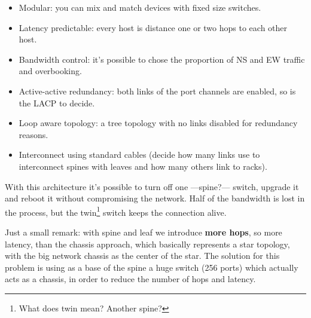 \begin{itemize}
   \item Modular: you can mix and match devices with fixed size switches.
   \item Latency predictable: every host is distance one or two hops to each other host.
   \item Bandwidth control: it's possible to chose the proportion of NS and EW traffic and overbooking.
   \item Active-active redundancy:  both links of the port channels are enabled, so is the LACP to decide.
   \item Loop aware topology: a tree topology with no links disabled for redundancy reasons.
   \item Interconnect using standard cables (decide how many links use to interconnect spines with leaves and how many others link to racks).
   
\end{itemize}
With this architecture it’s possible to turn off one ---spine?--- switch, upgrade it and reboot it without compromising the network. Half of the bandwidth is lost in the process, but the twin\footnote{What does twin mean? Another spine?} switch keeps the connection alive.

Just a small remark: with spine and leaf we introduce \textbf{more hops}, so more latency, than the chassis approach, which basically represents a star topology, with the big network chassis as the center of the star. 
The solution for this problem is using as a base of the spine a huge switch (256 ports) which actually acts as a chassis, in order to reduce the number of hops and latency.

